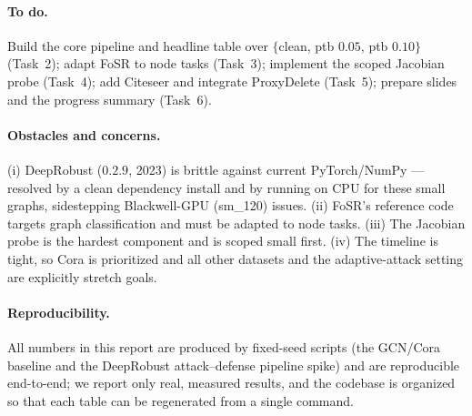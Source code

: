 \documentclass[10pt]{article}
\begin{document}
\paragraph{To do.} Build the core pipeline and headline table over $\{$clean, ptb $0.05$, ptb $0.10\}$
(Task~2); adapt FoSR to node tasks (Task~3); implement the scoped Jacobian probe (Task~4); add Citeseer
and integrate ProxyDelete (Task~5); prepare slides and the progress summary (Task~6).

\paragraph{Obstacles and concerns.} (i) DeepRobust ($0.2.9$, 2023) is brittle against current
PyTorch/NumPy --- resolved by a clean dependency install and by running on CPU for these small graphs,
sidestepping Blackwell-GPU (sm\_120) issues. (ii) FoSR's reference code targets graph classification and
must be adapted to node tasks. (iii) The Jacobian probe is the hardest component and is scoped small
first. (iv) The timeline is tight, so Cora is prioritized and all other datasets and the adaptive-attack
setting are explicitly stretch goals.

\paragraph{Reproducibility.} All numbers in this report are produced by fixed-seed scripts (the
GCN/Cora baseline and the DeepRobust attack--defense pipeline spike) and are reproducible end-to-end;
we report only real, measured results, and the codebase is organized so that each table can be
regenerated from a single command.



\end{document}
